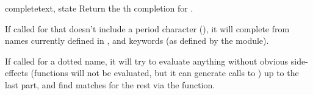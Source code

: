 \begin{methoddesc}[Completer]{complete}{text, state}
Return the th completion for .

If called for  that doesn't include a period character
(), it will complete from names currently defined in
,  and
keywords (as defined by the  module).

If called for a dotted name, it will try to evaluate anything without
obvious side-effects (functions will not be evaluated, but it
can generate calls to ) up to the last part, and
find matches for the rest via the  function.
\end{methoddesc}
